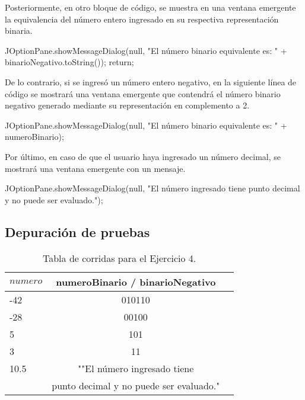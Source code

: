 Posteriormente, en otro bloque de código, se muestra en una ventana emergente la equivalencia del número entero ingresado en su respectiva representación binaria.
\begin{javaCode}
JOptionPane.showMessageDialog(null, "El número binario equivalente es: " + binarioNegativo.toString());
                return;
\end{javaCode}
De lo contrario, si se ingresó un número entero negativo, en la siguiente línea de código se mostrará una ventana emergente que contendrá el número binario negativo generado mediante su representación en complemento a 2.
\begin{javaCode}
JOptionPane.showMessageDialog(null, "El número binario equivalente es: " + numeroBinario);
\end{javaCode}
Por último, en caso de que el usuario haya ingresado un número decimal, se mostrará una ventana emergente con un mensaje.
\begin{javaCode}
JOptionPane.showMessageDialog(null, "El número ingresado tiene punto decimal y no puede ser evaluado.");
\end{javaCode}
\subsection{Depuración de pruebas}


\begin{table}[h]
  \centering
  \label{tab:tabla_ejemplo}
  \begin{tabular}{|l|c|r|}
    \hline
    \textbf{$numero$} & \textbf{numeroBinario / binarioNegativo} \\
    \hline
    -42 & 010110 \\
    -28 & 00100 \\
    5 & 101 \\
    3 & 11 \\
    10.5 & ""El número ingresado tiene  \\
     & punto decimal y no puede ser evaluado."  \\
    \hline
  \end{tabular}
  \caption{Tabla de corridas para el Ejercicio 4.}
\end{table}
